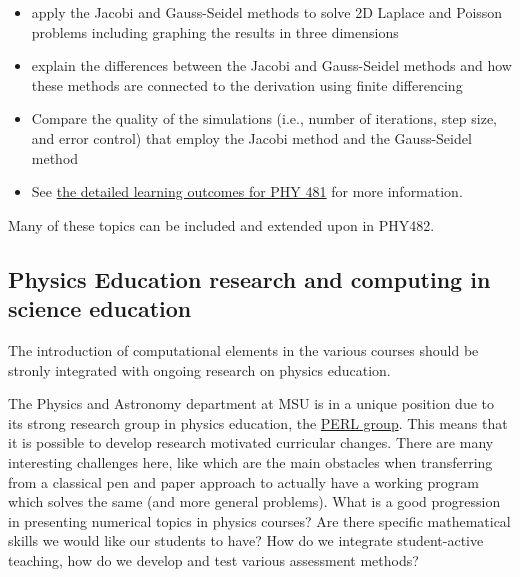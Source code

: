 \documentclass[%
oneside,                 %
final,                   %
10pt]{article}
\begin{document}
\begin{itemize}
  \item apply the Jacobi and Gauss-Seidel methods to solve 2D Laplace and Poisson problems including graphing the results in three dimensions

  \item explain the differences between the Jacobi and Gauss-Seidel methods and how these methods are connected to the derivation using finite differencing

  \item Compare the quality of the simulations (i.e., number of iterations, step size, and error control) that employ the Jacobi method and the Gauss-Seidel method

  \item See \href{{https://dannycab.github.io/phy481msu/learning_goals.html}}{the detailed learning outcomes for PHY 481} for more information.
\end{itemize}

\noindent
Many of these topics can be included and extended upon in PHY482. 

% 
% 

\subsection{Physics Education research and computing in science education}

The introduction of computational elements in the various courses should be stronly integrated with ongoing research on physics education.

The Physics and Astronomy department at MSU is in a unique position due to its strong research group in physics education, the \href{{http://www.pa.msu.edu/research/physics-education-lab}}{PERL group}.
This means that it is possible to
develop research motivated curricular changes.  There are many interesting challenges here, like
which are the main obstacles when transferring from a classical pen and paper approach to actually have a working program which solves the same (and more general problems). What is a good progression in presenting numerical topics in physics courses? Are there specific mathematical skills we would like our students to have? How do we integrate student-active teaching, how do we develop and test various assessment methods?
\end{document}
